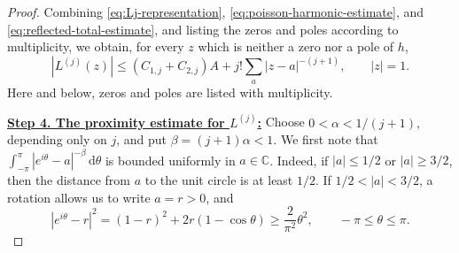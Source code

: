 \documentclass[12pt,letterpaper,reqno]{amsart}
\theoremstyle{definition}
\numberwithin{equation}{section}
\newcommand{\C}{\mathbb C}
\begin{document}
\begin{proof}
Combining \eqref{eq:Lj-representation},
\eqref{eq:poisson-harmonic-estimate}, and
\eqref{eq:reflected-total-estimate}, and listing the zeros and poles according to multiplicity, we obtain, for every \(z\) which is neither a zero nor a pole of \(h\),
\begin{equation}\label{eq:Lj-pointwise}
|L^{(j)}(z)|
\le
(C_{1,j}+C_{2,j})A+
j!\sum_a |z-a|^{-(j+1)},
\qquad |z|=1.
\end{equation}
Here and below, zeros and poles are
listed with multiplicity.

\medskip\noindent
\textbf{\underline{Step 4. The proximity estimate for \(L^{(j)}\):}}
Choose
$
0<\alpha<1/{(j+1)},
$
depending only on \(j\), and put
$
\beta=(j+1)\alpha<1.
$
We first note that
$
\int_{-\pi}^{\pi}|e^{i\theta}-a|^{-\beta}\,\mathrm d\theta
$
is bounded uniformly in \(a\in\C\). Indeed, if
\(|a|\le1/2\) or \(|a|\ge3/2\), then the distance from \(a\) to the unit
circle is at least \(1/2\). If \(1/2<|a|<3/2\), a rotation allows us to
write \(a=r>0\), and
$$
|e^{i\theta}-r|^2
=
(1-r)^2+2r(1-\cos\theta)
\ge
\frac{2}{\pi^2}\theta^2,
\qquad -\pi\le\theta\le\pi.
$$


\end{proof}
\end{document}
